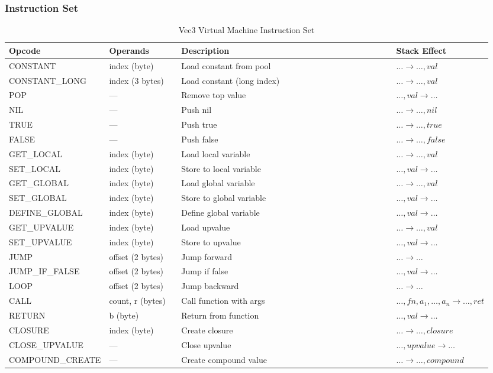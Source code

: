 \subsubsection{Instruction Set}

\begin{table}[h]
\caption{Vec3 Virtual Machine Instruction Set}
\label{tab:instruction-set}
\begin{tabular}{>{\ttfamily}p{0.2\linewidth} p{0.15\linewidth} p{0.45\linewidth} p{0.15\linewidth}}
\toprule
Opcode & Operands & Description & Stack Effect \\ 
\midrule
CONSTANT & index (byte) & Load constant from pool & $\dots \rightarrow \dots, val$ \\
CONSTANT\_LONG & index (3 bytes) & Load constant (long index) & $\dots \rightarrow \dots, val$ \\
POP & --- & Remove top value & $\dots, val \rightarrow \dots$ \\
NIL & --- & Push nil & $\dots \rightarrow \dots, nil$ \\
TRUE & --- & Push true & $\dots \rightarrow \dots, true$ \\
FALSE & --- & Push false & $\dots \rightarrow \dots, false$ \\
GET\_LOCAL & index (byte) & Load local variable & $\dots \rightarrow \dots, val$ \\
SET\_LOCAL & index (byte) & Store to local variable & $\dots, val \rightarrow \dots$ \\
GET\_GLOBAL & index (byte) & Load global variable & $\dots \rightarrow \dots, val$ \\
SET\_GLOBAL & index (byte) & Store to global variable & $\dots, val \rightarrow \dots$ \\
DEFINE\_GLOBAL & index (byte) & Define global variable & $\dots, val \rightarrow \dots$ \\
GET\_UPVALUE & index (byte) & Load upvalue & $\dots \rightarrow \dots, val$ \\
SET\_UPVALUE & index (byte) & Store to upvalue & $\dots, val \rightarrow \dots$ \\
JUMP & offset (2 bytes) & Jump forward & $\dots \rightarrow \dots$ \\
JUMP\_IF\_FALSE & offset (2 bytes) & Jump if false & $\dots, val \rightarrow \dots$ \\
LOOP & offset (2 bytes) & Jump backward & $\dots \rightarrow \dots$ \\
CALL & count, r (bytes) & Call function with args & $\dots, fn, a_1, \dots, a_n \rightarrow \dots, ret$ \\
RETURN & b (byte) & Return from function & $\dots, val \rightarrow \dots$ \\
CLOSURE & index (byte) & Create closure & $\dots \rightarrow \dots, closure$ \\
CLOSE\_UPVALUE & --- & Close upvalue & $\dots, upvalue \rightarrow \dots$ \\
COMPOUND\_CREATE & --- & Create compound value & $\dots \rightarrow \dots, compound$ \\
\bottomrule
\end{tabular}
\end{table}
